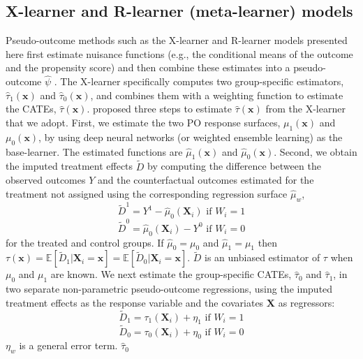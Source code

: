 \subsection{X-learner and R-learner (meta-learner) models}\label{x-learner-and-r-learner-meta-learner-models}

Pseudo-outcome methods such as the X-learner and R-learner models
presented here first estimate nuisance functions (e.g., the conditional
means of the outcome and the propensity score) and then combine these
estimates into a pseudo-outcome \(\hat{\psi}\) \citep{Kunzel2019meta, nie2021quasi}. The X-learner specifically computes two group-specific
estimators, \(\hat{\tau}_{1}\left(\mathbf{x}\right)\) and
\(\hat{\tau}_{0}\left(\mathbf{x}\right)\), and combines them with a
weighting function to estimate the CATEs,
\(\hat{\tau}\left(\mathbf{x}\right)\). \citet{Kunzel2019meta} proposed three
steps to estimate \(\hat{\tau}\left(\mathbf{x}\right)\) from the X-learner
that we adopt. First, we estimate the two PO response surfaces,
\(\mu_{1}\left(\mathbf{x}\right)\) and \(\mu_{0}\left(\mathbf{x}\right)\),
by using deep neural networks (or weighted ensemble learning) as the
base-learner. The estimated functions are
\(\widehat{\mu}_{1}\left(\mathbf{x}\right)\) and
\(\widehat{\mu}_{0}\left(\mathbf{x}\right)\). Second, we obtain the
imputed treatment effects \(\tilde{D}\) by computing the difference
between the observed outcomes \(Y\) and the counterfactual outcomes
estimated for the treatment not assigned using the corresponding
regression surface \(\widehat{\mu}_{w}\), \begin{equation}
\tilde{D}^{1}=Y^{1}-\widehat{\mu}_{0}\left(\mathbf{X}_{i}\right)\text{ if }W_{i}=1
\end{equation} \begin{equation}
\tilde{D}^{0}=\widehat{\mu}_{0}\left(\mathbf{X}_{i}\right)-Y^{0}\text{ if }W_{i}=0
\end{equation} for the treated and control groups. If
\(\widehat{\mu}_{0}=\mu_{0}\) and \(\widehat{\mu}_{1}=\mu_{1}\) then
\(\tau\left(\mathbf{x}\right)=\mathbb{E}\left[\tilde{D}_{1}|\mathbf{X}_{i}=\mathbf{x}\right]=\mathbb{E}\left[\tilde{D}_{0}|\mathbf{X}_{i}=\mathbf{x}\right]\).
\(\tilde{D}\) is an unbiased estimator of \(\tau\) when \(\mu_{0}\) and
\(\mu_{1}\) are known. We next estimate the group-specific CATEs,
\(\widehat{\tau}_{0}\) and \(\widehat{\tau}_{1}\), in two separate
non-parametric pseudo-outcome regressions, using the imputed treatment
effects as the response variable and the covariates \(\mathbf{X}\) as
regressors: \begin{equation}
\tilde{D}_{1}=\tau_{1}\left(\mathbf{X}_{i}\right)+\eta_{1}\text{ if }W_{i}=1
\end{equation} \begin{equation}
\tilde{D}_{0}=\tau_{0}\left(\mathbf{X}_{i}\right)+\eta_{0}\text{ if }W_{i}=0
\end{equation} \(\eta_{w}\) is a general error term. \(\widehat{\tau}_{0}\)
